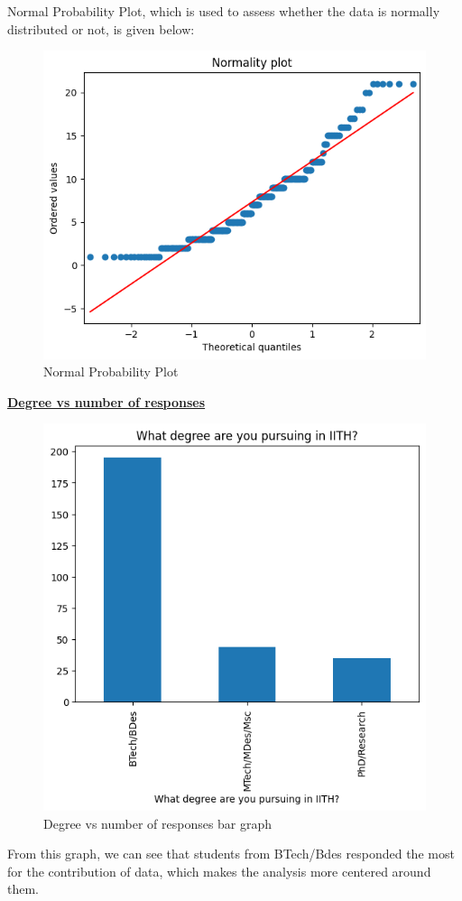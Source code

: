 \documentclass{article}
\begin{document}
Normal Probability Plot, which is used to assess whether the data is normally distributed or not, is given below:
\begin{figure}[H]
    \centering
    \includegraphics[scale = 0.9]{normality_plot.png}
    \caption{Normal Probability Plot}  
    \label{fig:Normality_plot}
\end{figure}

\pagebreak
\centerline{\underline{\bfseries{ Degree vs number of responses}}}

\begin{figure}[H]
    \centering
    \includegraphics[scale = 0.7]{bar_degree.png}
    \caption{Degree vs number of responses bar graph}  
    \label{fig:Normality_plot}
\end{figure}
From this graph, we can see that students from BTech/Bdes responded the most for the contribution of data, which makes the analysis more centered around them.
\end{document}
